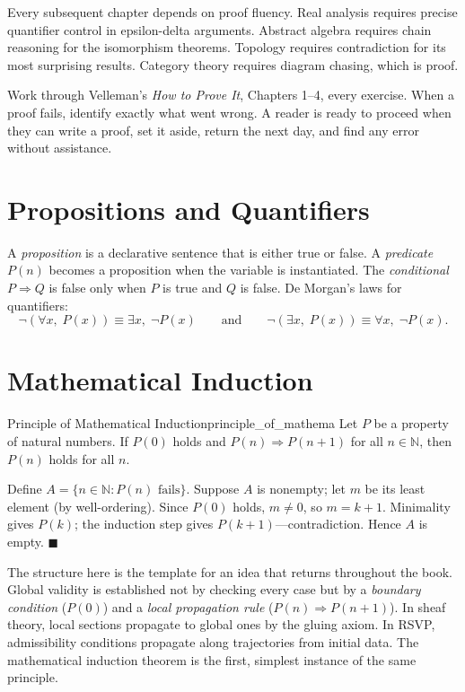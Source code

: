 \documentclass[12pt, twoside, openright, a4paper]{book}
\renewenvironment{proof}{%
  \par\medskip\noindent{\color{RSVPgreen}\bfseries\sffamily Proof.}\enspace\ignorespaces
}{\hfill{\color{RSVPgreen}$\blacksquare$}\par\medskip}
\newcommand{\N}{\mathbb{N}}
\begin{document}
\begin{dependencies}
Every subsequent chapter depends on proof fluency.
Real analysis requires precise quantifier control in epsilon-delta arguments.
Abstract algebra requires chain reasoning for the isomorphism theorems.
Topology requires contradiction for its most surprising results.
Category theory requires diagram chasing, which is proof.
\end{dependencies}

\begin{exercises_box}
Work through Velleman's \textit{How to Prove It}, Chapters 1--4, every exercise.
When a proof fails, identify exactly what went wrong.
A reader is ready to proceed when they can write a proof, set it aside, return the next day, and find any error without assistance.
\end{exercises_box}

\section{Propositions and Quantifiers}

A \emph{proposition} is a declarative sentence that is either true or false.
A \emph{predicate} $P(n)$ becomes a proposition when the variable is instantiated.
The \emph{conditional} $P \Rightarrow Q$ is false only when $P$ is true and $Q$ is false.
De Morgan's laws for quantifiers:
\[
\neg(\forall x,\; P(x)) \equiv \exists x,\; \neg P(x)
\qquad\text{and}\qquad
\neg(\exists x,\; P(x)) \equiv \forall x,\; \neg P(x).
\]

\section{Mathematical Induction}

\begin{theorem}{Principle of Mathematical Induction}{principle_of_mathema}
Let $P$ be a property of natural numbers.
If $P(0)$ holds and $P(n) \Rightarrow P(n+1)$ for all $n \in \N$, then $P(n)$ holds for all $n$.
\end{theorem}
\begin{proof}
Define $A = \{n \in \N : P(n) \text{ fails}\}$.
Suppose $A$ is nonempty; let $m$ be its least element (by well-ordering).
Since $P(0)$ holds, $m \neq 0$, so $m = k+1$.
Minimality gives $P(k)$; the induction step gives $P(k+1)$---contradiction.
Hence $A$ is empty.
\end{proof}

The structure here is the template for an idea that returns throughout the book.
Global validity is established not by checking every case but by a \emph{boundary condition} ($P(0)$) and a \emph{local propagation rule} ($P(n) \Rightarrow P(n+1)$).
In sheaf theory, local sections propagate to global ones by the gluing axiom.
In RSVP, admissibility conditions propagate along trajectories from initial data.
The mathematical induction theorem is the first, simplest instance of the same principle.
\end{document}
